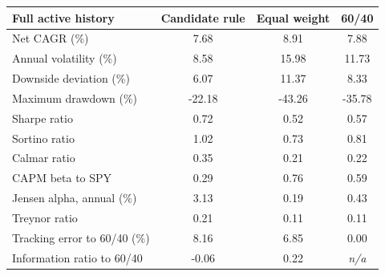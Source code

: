 \begin{tabular}{@{}lS[table-format=-2.2]S[table-format=-2.2]S[table-format=-2.2]@{}}
\toprule
Full active history & {Candidate rule} & {Equal weight} & {60/40} \\
\midrule
Net CAGR (\%) & 7.68 & 8.91 & 7.88 \\
Annual volatility (\%) & 8.58 & 15.98 & 11.73 \\
Downside deviation (\%) & 6.07 & 11.37 & 8.33 \\
Maximum drawdown (\%) & -22.18 & -43.26 & -35.78 \\
Sharpe ratio & 0.72 & 0.52 & 0.57 \\
Sortino ratio & 1.02 & 0.73 & 0.81 \\
Calmar ratio & 0.35 & 0.21 & 0.22 \\
CAPM beta to SPY & 0.29 & 0.76 & 0.59 \\
Jensen alpha, annual (\%) & 3.13 & 0.19 & 0.43 \\
Treynor ratio & 0.21 & 0.11 & 0.11 \\
Tracking error to 60/40 (\%) & 8.16 & 6.85 & 0.00 \\
Information ratio to 60/40 & -0.06 & 0.22 & {\textit{n/a}} \\
\bottomrule
\end{tabular}
